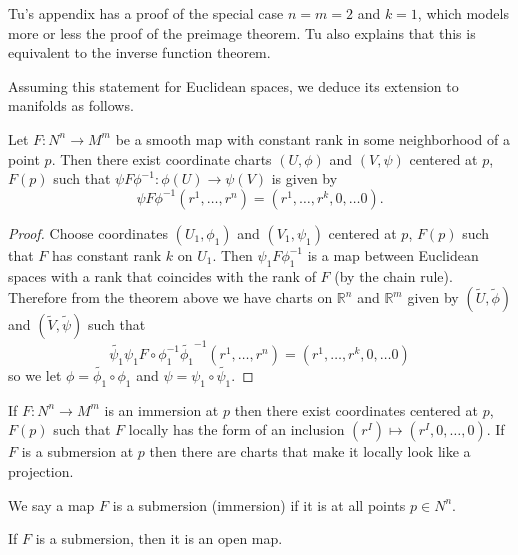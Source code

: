 \begin{remark}
Tu's appendix has a proof of the special case $n = m = 2$ and $k = 1$,
which models more or less the proof of the preimage theorem. Tu also
explains that this is equivalent to the inverse function theorem.
\end{remark}

Assuming this statement for Euclidean spaces, we deduce its extension
to manifolds as follows.

\begin{theorem}
Let $F: N^n \to M^m$ be a smooth map with constant rank in some
neighborhood of a point $p$. Then there exist coordinate charts
$(U, \phi)$ and $(V, \psi)$ centered at $p$, $F(p)$ such that
$\psi F \phi^{-1}: \phi(U) \to \psi(V)$ is given by
$$
  \psi F \phi^{-1}
    (r^1, \dots, r^n)
= (r^1, \dots, r^k, 0, \dots 0).
$$
\end{theorem}

\begin{proof}
Choose coordinates $(U_1, \phi_1)$ and $(V_1, \psi_1)$ centered at
$p$, $F(p)$ such that $F$ has constant rank $k$ on $U_1$. Then
$\psi_1 F \phi_1^{-1}$ is a map between Euclidean spaces with a rank
that coincides with the rank of $F$ (by the chain rule). Therefore
from the theorem above we have charts on $\mathbb{R}^n$ and
$\mathbb{R}^m$ given by
$(\tilde{U}, \tilde{\phi})$ and $(\tilde{V}, \tilde{\psi})$ such that
$$
  \tilde{\psi_1} \psi_1 F \circ \phi_1^{-1} \tilde{\phi_1}^{-1}
    (r^1, \dots, r^n)
=   (r^1, \dots, r^k, 0, \dots 0)
$$
so we let $\phi = \tilde{\phi_1} \circ \phi_1$ and
$\psi = \psi_1 \circ \tilde{\psi_1}$.
\end{proof}

\begin{corol}
If $F: N^n \to M^m$ is an immersion at $p$ then there exist
coordinates centered at $p$, $F(p)$ such that $F$ locally has the form
of an inclusion $(r^I) \mapsto (r^I, 0, \dots, 0)$. If $F$ is a
submersion at $p$ then there are charts that make it locally look like
a projection.
\end{corol}

\begin{defn}
We say a map $F$ is a submersion (immersion) if it is at all points $p
\in N^n$.
\end{defn}

\begin{corol}
If $F$ is a submersion, then it is an open map.
\end{corol}


